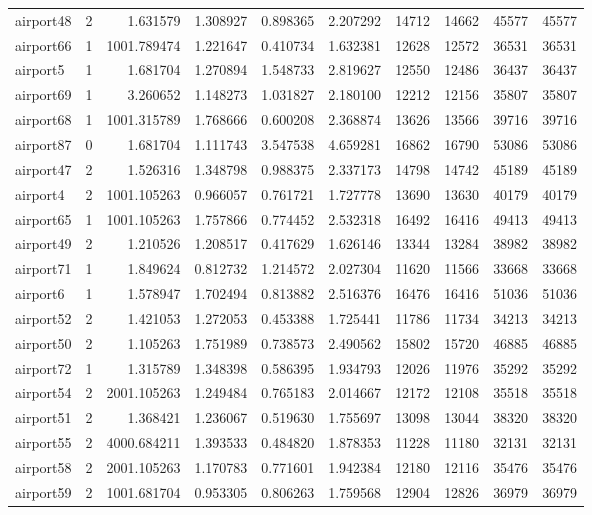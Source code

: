 \begin{longtable}{|l|r|r|r|r|r|r|r|r|r|}
airport48 & 2 & 1.631579 & 1.308927 & 0.898365 & 2.207292 & 14712 & 14662 & 45577 & 45577 \\
airport66 & 1 & 1001.789474 & 1.221647 & 0.410734 & 1.632381 & 12628 & 12572 & 36531 & 36531 \\
airport5 & 1 & 1.681704 & 1.270894 & 1.548733 & 2.819627 & 12550 & 12486 & 36437 & 36437 \\
airport69 & 1 & 3.260652 & 1.148273 & 1.031827 & 2.180100 & 12212 & 12156 & 35807 & 35807 \\
airport68 & 1 & 1001.315789 & 1.768666 & 0.600208 & 2.368874 & 13626 & 13566 & 39716 & 39716 \\
airport87 & 0 & 1.681704 & 1.111743 & 3.547538 & 4.659281 & 16862 & 16790 & 53086 & 53086 \\
airport47 & 2 & 1.526316 & 1.348798 & 0.988375 & 2.337173 & 14798 & 14742 & 45189 & 45189 \\
airport4 & 2 & 1001.105263 & 0.966057 & 0.761721 & 1.727778 & 13690 & 13630 & 40179 & 40179 \\
airport65 & 1 & 1001.105263 & 1.757866 & 0.774452 & 2.532318 & 16492 & 16416 & 49413 & 49413 \\
airport49 & 2 & 1.210526 & 1.208517 & 0.417629 & 1.626146 & 13344 & 13284 & 38982 & 38982 \\
airport71 & 1 & 1.849624 & 0.812732 & 1.214572 & 2.027304 & 11620 & 11566 & 33668 & 33668 \\
airport6 & 1 & 1.578947 & 1.702494 & 0.813882 & 2.516376 & 16476 & 16416 & 51036 & 51036 \\
airport52 & 2 & 1.421053 & 1.272053 & 0.453388 & 1.725441 & 11786 & 11734 & 34213 & 34213 \\
airport50 & 2 & 1.105263 & 1.751989 & 0.738573 & 2.490562 & 15802 & 15720 & 46885 & 46885 \\
airport72 & 1 & 1.315789 & 1.348398 & 0.586395 & 1.934793 & 12026 & 11976 & 35292 & 35292 \\
airport54 & 2 & 2001.105263 & 1.249484 & 0.765183 & 2.014667 & 12172 & 12108 & 35518 & 35518 \\
airport51 & 2 & 1.368421 & 1.236067 & 0.519630 & 1.755697 & 13098 & 13044 & 38320 & 38320 \\
airport55 & 2 & 4000.684211 & 1.393533 & 0.484820 & 1.878353 & 11228 & 11180 & 32131 & 32131 \\
airport58 & 2 & 2001.105263 & 1.170783 & 0.771601 & 1.942384 & 12180 & 12116 & 35476 & 35476 \\
airport59 & 2 & 1001.681704 & 0.953305 & 0.806263 & 1.759568 & 12904 & 12826 & 36979 & 36979 \\

\end{longtable}
